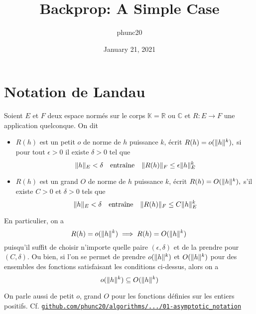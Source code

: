 \documentclass{article}
\author{phunc20}
\title{Backprop: A Simple Case}
\date{January 21, 2021}
\DeclarePairedDelimiter{\norm}{\lVert}{\rVert}
\begin{document}


\section{Notation de Landau}
Soient $E$ et $F$ deux espace normés sur le corps $\mathbb{K} = \mathbb{R}$ ou $\mathbb{C}$
et $R: E \to F$ une application quelconque. On dit
\begin{itemize}
  \item $R(h)$ est un petit $o$ de norme de $h$ puissance $k$, écrit $R(h) = o(\norm{h}^{k}),$ si
    pour tout $\epsilon > 0$ il existe $\delta > 0$ tel que
    $$
      \norm{h}_{E} < \delta \quad\text{entraîne}\quad \norm{R(h)}_{F} \le \epsilon \norm{h}_{E}^{k}
    $$

  \item $R(h)$ est un grand $O$ de norme de $h$ puissance $k$, écrit $R(h) = O(\norm{h}^{k}),$
    s'il existe $C > 0$ et $\delta > 0$ tels que
    $$
      \norm{h}_{E} < \delta \quad\text{entraîne}\quad \norm{R(h)}_{F} \le C \norm{h}_{E}^{k}
    $$
\end{itemize}

En particulier, on a
$$
R(h) = o(\norm{h}^{k}) \implies R(h) = O(\norm{h}^{k})\,
$$
puisqu'il suffit de choisir n'importe quelle paire $(\epsilon, \delta)$ et de la prendre pour $(C, \delta)$.
Ou bien, si l'on se permet de prendre $o(\norm{h}^{k})$ et $O(\norm{h}^{k})$ pour des ensembles des fonctions
satisfaisant les conditions ci-dessus, alors on a
$$
o(\norm{h}^{k}) \subseteq O(\norm{h}^{k})
$$

On parle aussi de petit $o$, grand $O$ pour les fonctions définies sur les entiers positifs.
Cf. \href{https://github.com/phunc20/algorithms/tree/main/CLRS/ch03-growth\_of\_fn/01-asymptotic\_notation}{\texttt{github.com/phunc20/algorithms/.../01-asymptotic\_notation}}
\end{document}

